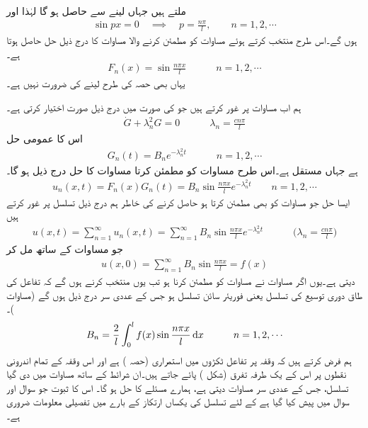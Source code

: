 ملتے ہیں جہاں  لینے سے  حاصل ہو گا لہٰذا  اور 
\begin{align*}
\sin px=0\quad \implies \quad p=\frac{n\pi}{l}, \quad \quad n=1,2,\cdots 
\end{align*}
ہوں گے۔اس طرح  منتخب  کرتے ہوئے مساوات  کو مطمئن کرنے والا مساوات  کا درج ذیل حل  حاصل ہوتا ہے۔
\begin{align*}
F_n(x)=\sin \frac{n\pi x}{l}\quad \quad \quad n=1,2,\cdots
\end{align*}
یہاں بھی حصہ  کی طرح  لینے کی ضرورت نہیں ہے۔

ہم اب مساوات  پر غور کرتے ہیں جو  کی صورت میں درج ذیل صورت اختیار کرتی ہے۔
\begin{align*}
\dot{G}+\lambda_n^2G=0\quad \quad \quad \lambda_n=\frac{cn\pi}{l}
\end{align*}
اس کا عمومی حل
\begin{align*}
G_n(t)=B_ne^{-\lambda_n^2t}\quad \quad \quad n=1,2,\cdots
\end{align*}
ہے جہاں  مستقل ہے۔اس طرح مساوات  کو مطمئن کرتا مساوات  کا حل درج ذیل ہو گا۔
\begin{align}\label{مساوات_جزوی_حل_حرارت_ث}
u_n(x,t)=F_n(x)G_n(t)=B_n\sin\frac{n\pi x}{l}e^{-\lambda_n^2t}\quad \quad n=1,2,\cdots
\end{align}
\quad ایسا حل جو مساوات  کو بھی مطمئن کرتا ہو حاصل کرنے کی خاطر ہم درج ذیل تسلسل پر غور کرتے ہیں
\begin{align}\label{مساوات_جزوی_حل_حرارت_ج}
u(x,t)=\sum_{n=1}^{\infty} u_n(x,t)=\sum_{n=1}^{\infty}B_n\sin\frac{n\pi x}{l}e^{-\lambda_n^2t}\quad \quad\quad \big(\lambda_n=\frac{cn\pi}{l}\big)
\end{align}
جو مساوات  کے  ساتھ مل کر
\begin{align*}
u(x,0)=\sum_{n=1}^{\infty} B_n\sin\frac{n\pi x}{l}=f(x)
\end{align*}
دیتی ہے۔یوں  اگر مساوات  نے مساوات  کو مطمئن کرنا ہو تب  یوں منتخب کرنے ہوں گے کہ  تفاعل  کی طاق دوری توسیع کی تسلسل یعنی فوریئر سائن تسلسل ہو جس کے عددی سر درج ذیل ہوں گے (مساوات )۔
\begin{align}\label{مساوات_جزوی_حل_حرارت_چ}
B_n=\frac{2}{l}\int_0^l f(x)\sin\frac{n\pi x}{l}\dif x\quad \quad \quad n=1,2,\cdots
\end{align}
ہم فرض کرتے ہیں کہ وقفہ  پر تفاعل  ٹکڑوں میں استمراری (حصہ ) ہے  اور اس وقفہ کے تمام اندرونی نقطوں پر اس کے یک طرفہ تفرق (شکل ) پائے جاتے ہیں۔ان شرائط کے ساتھ مساوات  میں دی گیا تسلسل، جس کے عددی سر مساوات  دیتی ہے، ہمارے مسئلے کا حل ہو گا۔ اس کا ثبوت جو سوال  اور سوال  میں پیش کیا گیا ہے کے لئے تسلسل کی یکساں ارتکاز کے بارے میں تفصیلی معلومات ضروری ہے۔


